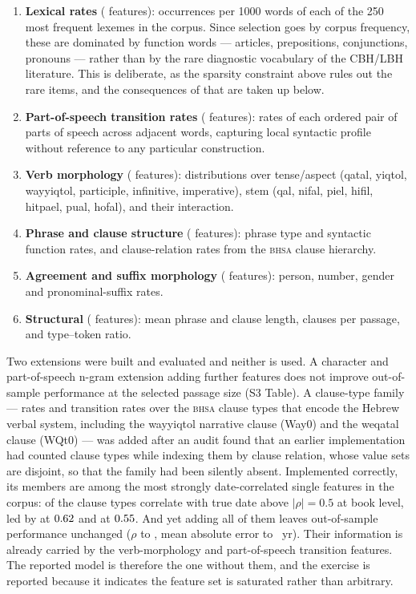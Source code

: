 \documentclass[10pt,letterpaper]{article}
\newcommand{\bhsa}{\textsc{bhsa}}
\newcommand{\cbh}{CBH}
\newcommand{\lbh}{LBH}
\begin{document}
\begin{enumerate}
  \item \textbf{Lexical rates} (\Flex{} features): occurrences per 1000 words of
    each of the 250 most frequent lexemes in the corpus.  Since selection goes
    by corpus frequency, these are dominated by function words --- articles,
    prepositions, conjunctions, pronouns --- rather than by the rare
    diagnostic vocabulary of the \cbh{}/\lbh{} literature.  This is deliberate,
    as the sparsity constraint above rules out the rare items, and the
    consequences of that are taken up below.
  \item \textbf{Part-of-speech transition rates} (\Fpos{} features): rates of each
    ordered pair of parts of speech across adjacent words, capturing local
    syntactic profile without reference to any particular construction.
  \item \textbf{Verb morphology} (\Fverb{} features): distributions over tense/aspect
    (qatal, yiqtol, wayyiqtol, participle, infinitive, imperative), stem (qal,
    nifal, piel, hifil, hitpael, pual, hofal), and their interaction.
  \item \textbf{Phrase and clause structure} (\Fphr{} features): phrase type and
    syntactic function rates, and clause-relation rates from the \bhsa{}
    clause hierarchy.
  \item \textbf{Agreement and suffix morphology} (\Fagr{} features): person, number,
    gender and pronominal-suffix rates.
  \item \textbf{Structural} (\Fstruct{} features): mean phrase and clause length,
    clauses per passage, and type--token ratio.
\end{enumerate}

Two extensions were built and evaluated and neither is used.  A character and
part-of-speech n-gram extension adding \NGfeat{} further features does not improve
out-of-sample performance at the selected passage size (S3 Table).  A
clause-type family --- rates and transition rates over the \bhsa{} clause types
that encode the Hebrew verbal system, including the wayyiqtol narrative clause
(Way0) and the weqatal clause (WQt0) --- was added after an audit found that an
earlier implementation had counted clause types while indexing them by clause
relation, whose value sets are disjoint, so that the family had been silently
absent.  Implemented correctly, its members are among the most strongly
date-correlated single features in the corpus: \CTYPnHalf{} of the \CTYPnAll{}
clause types correlate with true date above $|\rho| = 0.5$ at book level, led by
\CTYPtopName{} at $0.62$ and \CTYPsecName{} at $0.55$.  And yet
adding all \CTYPfeat{} of them
leaves out-of-sample performance unchanged ($\rho$ \CTYPrhoBefore{} to
\CTYPrhoAfter, mean absolute error \CTYPmaeBefore{} to \CTYPmaeAfter~yr).  Their information is already carried by the
verb-morphology and part-of-speech transition features.  The reported model is
therefore the one without them, and the exercise is reported because it
indicates the feature set is saturated rather than arbitrary.
\end{document}
